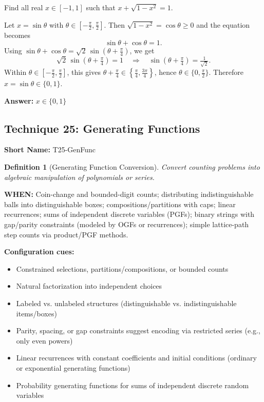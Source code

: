 \documentclass[12pt]{article}
\newtheorem{definition}{Definition}[section]
\newenvironment{problem}[1]
{\begin{tcolorbox}[colback=blue!5!white,colframe=blue!75!black,title={#1}]}{\end{tcolorbox}}
\newenvironment{solution}
{\begin{tcolorbox}[colback=green!5!white,colframe=green!75!black,title={Solution}]}{\end{tcolorbox}}
\begin{document}
\begin{problem}{Example: Solve with $x = \sin\theta$}
Find all real $x \in [-1,1]$ such that $x + \sqrt{1 - x^2} = 1$.
\end{problem}

\begin{solution}
Let $x = \sin\theta$ with $\theta \in [-\tfrac{\pi}{2}, \tfrac{\pi}{2}]$. Then $\sqrt{1 - x^2} = \cos\theta \ge 0$ and the equation becomes
\[ \sin\theta + \cos\theta = 1. \]
Using $\sin\theta + \cos\theta = \sqrt{2}\,\sin\!\left(\theta + \tfrac{\pi}{4}\right)$, we get
\[ \sqrt{2}\,\sin\!\left(\theta + \tfrac{\pi}{4}\right) = 1 \quad \Longrightarrow \quad \sin\!\left(\theta + \tfrac{\pi}{4}\right) = \tfrac{1}{\sqrt{2}}. \]
Within $\theta \in [-\tfrac{\pi}{2}, \tfrac{\pi}{2}]$, this gives $\theta + \tfrac{\pi}{4} \in \left\{ \tfrac{\pi}{4}, \tfrac{3\pi}{4} \right\}$, hence $\theta \in \{0, \tfrac{\pi}{2}\}$. Therefore $x = \sin\theta \in \{0, 1\}$.

\textbf{Answer:} $x \in \{0, 1\}$
\end{solution}

\subsection{Technique 25: Generating Functions}
\textbf{Short Name:} T25-GenFunc

\begin{definition}[Generating Function Conversion]
Convert counting problems into algebraic manipulation of polynomials or series.
\end{definition}

\textbf{WHEN:} Coin-change and bounded-digit counts; distributing indistinguishable balls into distinguishable boxes; compositions/partitions with caps; linear recurrences; sums of independent discrete variables (PGFs); binary strings with gap/parity constraints (modeled by OGFs or recurrences); simple lattice-path step counts via product/PGF methods.

\textbf{Configuration cues:}
\begin{itemize}
    \item Constrained selections, partitions/compositions, or bounded counts
    \item Natural factorization into independent choices
    \item Labeled vs. unlabeled structures (distinguishable vs. indistinguishable items/boxes)
    \item Parity, spacing, or gap constraints suggest encoding via restricted series (e.g., only even powers)
    \item Linear recurrences with constant coefficients and initial conditions (ordinary or exponential generating functions)
    \item Probability generating functions for sums of independent discrete random variables
\end{itemize}
\end{document}
